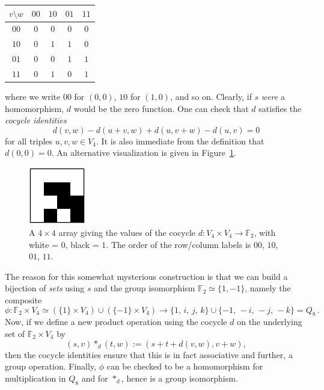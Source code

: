 \documentclass{article}
\theoremstyle{plain}
\theoremstyle{definition}
\def \FF {\mathbb{F}}
\begin{document}
\begin{center}
\begin{tabular*}{0.35\textwidth}{c|cccc}
$v\setminus w$&$00$&$10$&$01$&$11$\\
\hline
	$00$		& $0$& $0$& $0$& $0$\\
	$10$		& $0$& $1$& $1$& $0$\\
	$01$		& $0$& $0$& $1$& $1$\\
	$11$		& $0$& $1$& $0$& $1$\\
\end{tabular*}
\end{center}
where we write $00$ for $(0,0)$, $10$ for $(1,0)$, and so on.
Clearly, if $s$ \emph{were} a homomorphism, $d$ would be the zero function.
One can check that $d$ satisfies the \emph{cocycle identities}
\begin{equation}\label{eq:cocycle_eqn}
	d(v,w)-d(u+v,w)+d(u,v+w)-d(u,v) = 0
\end{equation}
for all triples $u,v,w\in V_4$. 
It is also immediate from the definition that $d(0,0)=0$.
An alternative visualization is given in Figure~\ref{fig:cocycle for q8}.

\begin{figure}[!ht]
\begin{center}
\includegraphics[height=2.5cm]{quaternion_cocyc} %
\end{center}
\caption{A $4\times4$ array giving the values of the cocycle $d\colon V_4\times V_4\to \FF_2$, with white = $0$, black = $1$. The order of the row/column labels is $00$, $10$, $01$, $11$.}
\label{fig:cocycle for q8}
\end{figure}


The reason for this somewhat mysterious construction is that we can build a bijection of \emph{sets} using $s$ and the group isomorphism $\FF_2\simeq \{1,-1\}$, namely the composite
\[
	\phi\colon \FF_2\times V_4 \simeq \left(\{1\}\times V_4\right) \cup \left(\{-1\} \times V_4\right)\! \to\!
	\{1,\, i,\, j,\, k\}\cup \{-1,\, -i,\, -j,\, -k\} = Q_8\,.
\]
Now, if we define a new product operation using the cocycle $d$ on the underlying set of $\FF_2\times V_4$ by
\[
	(s,v)\ast_d(t,w):=(s+ t+ d(v,w),v+w),
\]
then the cocycle identities ensure that this is in fact associative and further, a group operation.
Finally, $\phi$ can be checked to be a homomorphism for multiplication in $Q_8$ and for $\ast_d$, hence is a group isomorphism.
\end{document}
